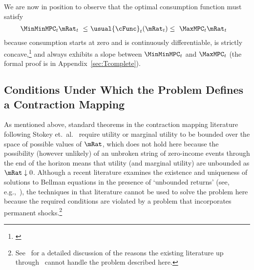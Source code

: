 \documentclass[BufferStockTheory]{subfiles}
\begin{document}
\hypertarget{cBounds}{}
We are now in position to observe that the optimal consumption function must satisfy
\begin{align}
  \MinMinMPC_{t} \mRat_{t} ~ \leq & ~  \usual{\cFunc}_{t}(\mRat_{t})  \leq  ~ \MaxMPC_{t} \mRat_{t} \label{eq:cBounds}
\end{align}
because consumption starts at zero and is continuously differentiable, is strictly concave,\footnote{\cite{ckConcavity}} and always exhibits a slope between $\MinMinMPC_{t}$ and $\MaxMPC_{t}$ (the formal proof is in Appendix~\ref{sec:Tcomplete}).


\begin{comment}
  If the \FHWC~does not hold, we make do with a less useful bound on the minimal MPC: It is weakly greater than zero, which follows from the logic in
 ~\ref{sec:cExists}; hence the `max' in~\eqref{eq:MinMinMPCDef}.
\end{comment}

\hypertarget{Conditions-Under-Which-the-Problem-Defines-a-Contraction-Mapping}{}
\subsection{Conditions Under Which the Problem Defines a Contraction Mapping}\label{subsec:contraction}

As mentioned above, standard theorems in the contraction mapping literature following Stokey et.\ al.~\citeyearpar{slpMethods} require utility or marginal utility to be bounded over the space of possible values of $\mRat$, which does not hold here because the possibility (however unlikely) of an unbroken string of zero-income events through the end of the horizon means that utility (and marginal utility) are unbounded as $\mRat \downarrow 0$.  Although a recent literature examines the existence and uniqueness of solutions to Bellman equations in the presence of `unbounded returns' (see, e.g.,~\cite{mnUnique}), the techniques in that literature cannot be used to solve the problem here because the required conditions are violated by a problem that incorporates permanent shocks.\footnote{See~\cite{yaoNote} for a detailed discussion of the reasons the existing literature up through~\cite{mnUnique} cannot handle the problem described here.}
\end{document}
